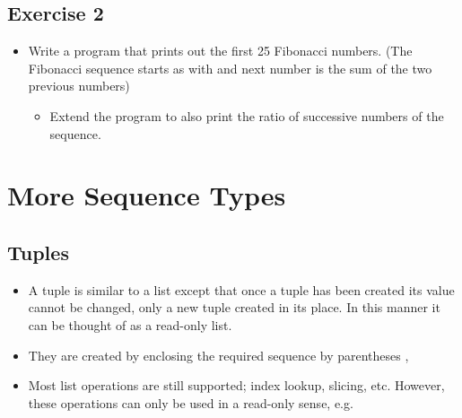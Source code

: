 \documentclass[letterpaper,10pt,english,openany]{sphinxmanual}
\begin{document}
\subsection{Exercise 2}
\label{\detokenize{introduction_to_python/basic_python_exercises_1-2:exercise-2}}\begin{itemize}
\item {} 
Write a program that prints out the first 25 Fibonacci numbers. (The
Fibonacci sequence starts as with  and next number is the sum
of the two previous numbers)
\begin{itemize}
\item {} 
Extend the program to also print the ratio of successive numbers
of the sequence.

\end{itemize}

\end{itemize}


\section{More Sequence Types}
\label{\detokenize{introduction_to_python/more_sequence_types:more-sequence-types}}\label{\detokenize{introduction_to_python/more_sequence_types:id1}}\label{\detokenize{introduction_to_python/more_sequence_types::doc}}

\subsection{Tuples}
\label{\detokenize{introduction_to_python/more_sequence_types:tuples}}\begin{itemize}
\item {} 
A tuple is similar to a list except that once a tuple has been
created its value cannot be changed, only a new tuple created in its
place. In this manner it can be thought of as a read-only list.

\item {} 
They are created by enclosing the required sequence by parentheses
\sphinxcode{\sphinxupquote{()}},

\end{itemize}

\begin{sphinxVerbatim}[commandchars=\\\{\}]
  
\end{sphinxVerbatim}
\begin{itemize}
\item {} 
Most list operations are still supported; index lookup, slicing, etc.
However, these operations can only be used in a read-only sense, e.g.

\end{itemize}
\end{document}
